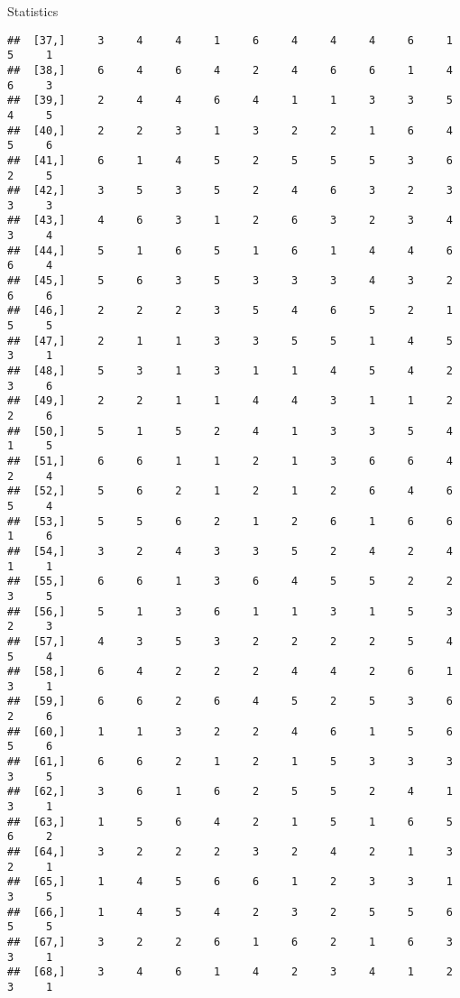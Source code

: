 \documentclass[
  ignorenonframetext,
]{beamer}
\begin{document}
\begin{frame}[fragile]{Statistics}
\begin{verbatim}
##  [37,]     3     4     4     1     6     4     4     4     6     1     5     1
##  [38,]     6     4     6     4     2     4     6     6     1     4     6     3
##  [39,]     2     4     4     6     4     1     1     3     3     5     4     5
##  [40,]     2     2     3     1     3     2     2     1     6     4     5     6
##  [41,]     6     1     4     5     2     5     5     5     3     6     2     5
##  [42,]     3     5     3     5     2     4     6     3     2     3     3     3
##  [43,]     4     6     3     1     2     6     3     2     3     4     3     4
##  [44,]     5     1     6     5     1     6     1     4     4     6     6     4
##  [45,]     5     6     3     5     3     3     3     4     3     2     6     6
##  [46,]     2     2     2     3     5     4     6     5     2     1     5     5
##  [47,]     2     1     1     3     3     5     5     1     4     5     3     1
##  [48,]     5     3     1     3     1     1     4     5     4     2     3     6
##  [49,]     2     2     1     1     4     4     3     1     1     2     2     6
##  [50,]     5     1     5     2     4     1     3     3     5     4     1     5
##  [51,]     6     6     1     1     2     1     3     6     6     4     2     4
##  [52,]     5     6     2     1     2     1     2     6     4     6     5     4
##  [53,]     5     5     6     2     1     2     6     1     6     6     1     6
##  [54,]     3     2     4     3     3     5     2     4     2     4     1     1
##  [55,]     6     6     1     3     6     4     5     5     2     2     3     5
##  [56,]     5     1     3     6     1     1     3     1     5     3     2     3
##  [57,]     4     3     5     3     2     2     2     2     5     4     5     4
##  [58,]     6     4     2     2     2     4     4     2     6     1     3     1
##  [59,]     6     6     2     6     4     5     2     5     3     6     2     6
##  [60,]     1     1     3     2     2     4     6     1     5     6     5     6
##  [61,]     6     6     2     1     2     1     5     3     3     3     3     5
##  [62,]     3     6     1     6     2     5     5     2     4     1     3     1
##  [63,]     1     5     6     4     2     1     5     1     6     5     6     2
##  [64,]     3     2     2     2     3     2     4     2     1     3     2     1
##  [65,]     1     4     5     6     6     1     2     3     3     1     3     5
##  [66,]     1     4     5     4     2     3     2     5     5     6     5     5
##  [67,]     3     2     2     6     1     6     2     1     6     3     3     1
##  [68,]     3     4     6     1     4     2     3     4     1     2     3     1

\end{verbatim}
\end{frame}
\end{document}
